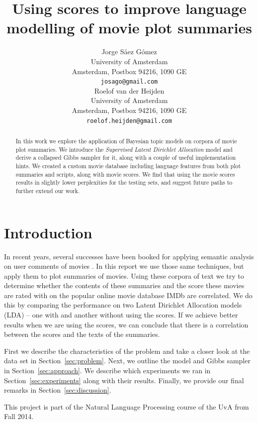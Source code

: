\documentclass{article} %
\title{Using scores to improve language modelling of movie plot summaries}
\author{
Jorge S\'{a}ez G\'{o}mez\\
University of Amsterdam\\
Amsterdam, Postbox 94216, 1090 GE\\
\texttt{josago@gmail.com} \\
\And
Roelof van der Heijden \\
University of Amsterdam\\
Amsterdam, Postbox 94216, 1090 GE\\
\texttt{roelof.heijden@gmail.com} \\
}
\begin{document}
\maketitle

\begin{abstract}
In this work we explore the application of Bayesian topic models on corpora of movie plot summaries. We introduce the \textit{Supervised Latent Dirichlet Allocation} model and derive a collapsed Gibbs sampler for it, along with a couple of useful implementation hints. We created a custom movie database including language features from both plot summaries and scripts, along with movie scores. We find that using the movie scores results in slightly lower perplexities for the testing sets, and suggest future paths to further extend our work.
\end{abstract}

\section{Introduction} 
In recent years, several successes have been booked for applying semantic analysis on user comments of movies \cite{MovieRegression, PredictStars}.
In this report we use those same techniques, but apply them to plot summaries of movies.
Using these corpora of text we try to determine whether the contents of these summaries and the score these movies are rated with on the popular online movie database IMDb \cite{IMDb} are correlated.
We do this by comparing the performance on two Latent Dirichlet Allocation models (LDA) -- one with and another without using the scores.
If we achieve better results when we are using the scores, we can conclude that there is a correlation between the scores and the texts of the summaries.

First we describe the characteristics of the problem and take a closer look at the data set in Section~\ref{sec:problem}.
Next, we outline the model and Gibbs sampler in Section~\ref{sec:approach}.
We describe which experiments we ran in Section~\ref{sec:experiments} along with their results.
Finally, we provide our final remarks in Section~\ref{sec:discussion}.

This project is part of the Natural Language Processing course of the UvA from Fall 2014.
\end{document}
